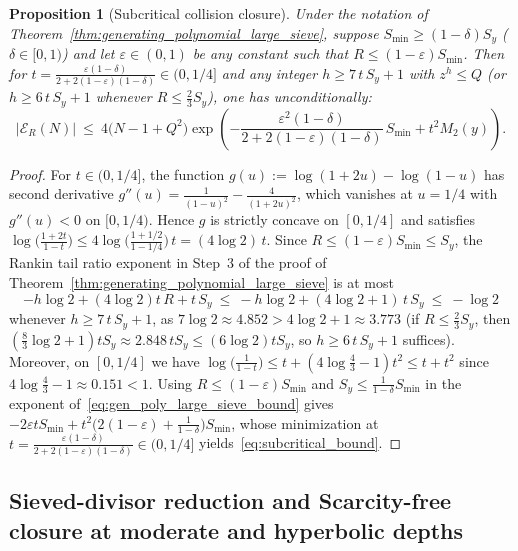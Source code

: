 \documentclass[11pt, a4paper]{article}
\theoremstyle{plain}
\newtheorem{proposition}[theorem]{Proposition}
\theoremstyle{definition}
\begin{document}
\begin{proposition}[Subcritical collision closure]\label{prop:subcritical_collision_rate}
Under the notation of Theorem~\ref{thm:generating_polynomial_large_sieve}, suppose $S_{\min}\ge(1-\delta)S_y$ ($\delta\in[0,1)$) and let $\varepsilon\in(0,1)$ be any constant such that $R\le(1-\varepsilon)S_{\min}$. Then for $t=\frac{\varepsilon(1-\delta)}{2+2(1-\varepsilon)(1-\delta)}\in(0,1/4]$ and any integer $h\ge 7\,t\,S_y+1$ with $z^{h}\le Q$ (or $h\ge 6\,t\,S_y+1$ whenever $R\le\frac23 S_y$), one has unconditionally:
\begin{equation}\label{eq:subcritical_bound}
|\mathcal{E}_R(N)|\ \le\ 4\big(N-1+Q^{2}\big)\exp\!\left(-\frac{\varepsilon^{2}(1-\delta)}{2+2(1-\varepsilon)(1-\delta)}\,S_{\min}+t^{2}M_2(y)\right).
\end{equation}
\end{proposition}
\begin{proof}
For $t\in(0,1/4]$, the function $g(u):=\log(1+2u)-\log(1-u)$ has second derivative $g''(u)=\frac{1}{(1-u)^{2}}-\frac{4}{(1+2u)^{2}}$, which vanishes at $u=1/4$ with $g''(u)<0$ on $[0,1/4)$. Hence $g$ is strictly concave on $[0,1/4]$ and satisfies $\log\!\big(\frac{1+2t}{1-t}\big)\le 4\log\big(\frac{1+1/2}{1-1/4}\big)\,t=(4\log 2)\,t$. Since $R\le(1-\varepsilon)S_{\min}\le S_y$, the Rankin tail ratio exponent in Step~3 of the proof of Theorem~\ref{thm:generating_polynomial_large_sieve} is at most
$$-h\log 2+(4\log 2)t\,R+t\,S_y\ \le\ -h\log 2+(4\log 2+1)\,t\,S_y\ \le\ -\log 2$$
whenever $h\ge 7\,t\,S_y+1$, as $7\log 2\approx 4.852>4\log 2+1\approx 3.773$ (if $R\le\frac23 S_y$, then $(\frac83\log 2+1)tS_y\approx 2.848\,tS_y\le(6\log 2)tS_y$, so $h\ge 6\,t\,S_y+1$ suffices). Moreover, on $[0,1/4]$ we have $\log\!\big(\frac{1}{1-t}\big)\le t+(4\log\frac43-1)t^{2}\le t+t^{2}$ since $4\log\frac43-1\approx 0.151<1$. Using $R\le(1-\varepsilon)S_{\min}$ and $S_y\le\frac{1}{1-\delta}S_{\min}$ in the exponent of~\eqref{eq:gen_poly_large_sieve_bound} gives $-2\varepsilon tS_{\min}+t^{2}\big(2(1-\varepsilon)+\frac{1}{1-\delta}\big)S_{\min}$, whose minimization at $t=\frac{\varepsilon(1-\delta)}{2+2(1-\varepsilon)(1-\delta)}\in(0,1/4]$ yields~\eqref{eq:subcritical_bound}.
\end{proof}

\subsection{Sieved-divisor reduction and Scarcity-free closure at moderate and hyperbolic depths}\label{subsec:moderate_and_hyperbolic}
\end{document}
